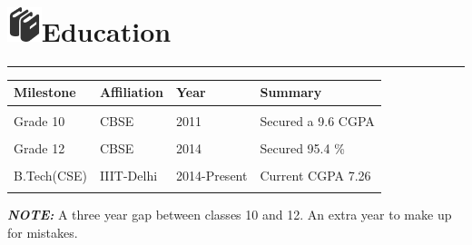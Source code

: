 \documentclass{article}
\begin{document}
	\section*{\includegraphics[width=1cm]{buttons/books.png}Education}
		\textcolor[RGB]{220,220,220}{\rule{\linewidth}{0.3pt}}
		\begin{center}
		    \begin{tabular}{ | p{3cm}  p{3cm}  p{3cm}  p{5cm} |}
		    \hline
		    \textbf{Milestone} & \textbf{Affiliation} & \textbf{Year} & \textbf{Summary} \\ \hline
		    &&&\\
		  	Grade 10 & CBSE & 2011 &  Secured a 9.6 CGPA \\ 
		    &&&\\
		    Grade 12 & CBSE & 2014 &  Secured 95.4 \% \\ 
			&&&\\
		   	B.Tech(CSE) & IIIT-Delhi & 2014-Present &  Current CGPA 7.26 \\ 
			&&&\\
			\hline
		    \end{tabular}
		\end{center}
		\hspace*{1.7cm}
		\textit{\textbf{NOTE:}} A three year gap between classes 10 and 12. An extra year to make up for mistakes.
		
\end{document}
